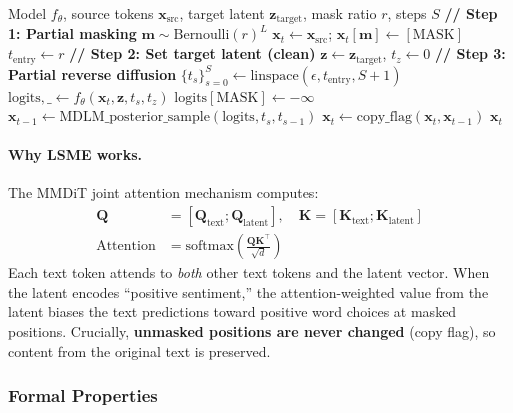 \documentclass{article}
\begin{document}
\begin{algorithm}[t]
\caption{LSME: Latent-Steered Masked Editing}
\label{alg:lsme}
\begin{algorithmic}[1]
\REQUIRE Model $f_\theta$, source tokens $\mathbf{x}_\text{src}$, target latent $\mathbf{z}_\text{target}$, mask ratio $r$, steps $S$
\STATE \textbf{// Step 1: Partial masking}
\STATE $\mathbf{m} \sim \text{Bernoulli}(r)^L$ 
\STATE $\mathbf{x}_t \leftarrow \mathbf{x}_\text{src}$; \quad $\mathbf{x}_t[\mathbf{m}] \leftarrow [\text{MASK}]$
\STATE $t_\text{entry} \leftarrow r$
\STATE \textbf{// Step 2: Set target latent (clean)}
\STATE $\mathbf{z} \leftarrow \mathbf{z}_\text{target}$, \quad $t_z \leftarrow 0$
\STATE \textbf{// Step 3: Partial reverse diffusion}
\STATE $\{t_s\}_{s=0}^{S} \leftarrow \text{linspace}(\epsilon, t_\text{entry}, S+1)$
    \STATE $\text{logits}, \_ \leftarrow f_\theta(\mathbf{x}_t, \mathbf{z}, t_s, t_z)$
    \STATE $\text{logits}[\text{MASK}] \leftarrow -\infty$
    \STATE $\mathbf{x}_{t-1} \leftarrow \text{MDLM\_posterior\_sample}(\text{logits}, t_s, t_{s-1})$
    \STATE $\mathbf{x}_t \leftarrow \text{copy\_flag}(\mathbf{x}_t, \mathbf{x}_{t-1})$ 
\ENDFOR
\RETURN $\mathbf{x}_t$
\end{algorithmic}
\end{algorithm}

\paragraph{Why LSME works.}
The MMDiT joint attention mechanism computes:
\begin{align}
    \mathbf{Q} &= [\mathbf{Q}_\text{text}; \mathbf{Q}_\text{latent}], \quad
    \mathbf{K} = [\mathbf{K}_\text{text}; \mathbf{K}_\text{latent}] \\
    \text{Attention} &= \text{softmax}\left(\frac{\mathbf{Q}\mathbf{K}^\top}{\sqrt{d}}\right)
\end{align}
Each text token attends to \emph{both} other text tokens and the latent vector.
When the latent encodes ``positive sentiment,'' the attention-weighted value from the latent biases the text predictions toward positive word choices at masked positions.
Crucially, \textbf{unmasked positions are never changed} (copy flag), so content from the original text is preserved.

\subsubsection*{Formal Properties}
\end{document}
